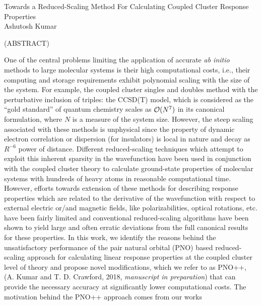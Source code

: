 \documentclass[12pt]{report}
\begin{document}
\thispagestyle{empty}
\begin{center}

{\Large
Towards a Reduced-Scaling Method For Calculating Coupled Cluster Response Properties 
}\\

\vspace{8em}
Ashutosh Kumar
\vspace{8em}


(ABSTRACT)


\end{center}
One of the central problems limiting the application of accurate {\em ab
initio} methods to large molecular systems is their high computational costs,
i.e., their computing and storage requirements exhibit polynomial scaling with
the size of the system. For example, the coupled cluster singles and doubles 
method with the perturbative inclusion of triples: the CCSD(T) model, 
which is considered as the ``gold standard'' of quantum chemistry scales as 
${\cal O}(N^7)$ in its canonical formulation, where $N$ is a measure of the 
system size. However, the steep scaling associated with these methods is 
unphysical since the property of dynamic electron correlation or dispersion 
(for insulators) is local in nature and decay as $R^{-6}$ power of distance. 
Different reduced-scaling techniques which attempt to exploit this inherent 
sparsity in the wavefunction have been used in conjunction with the coupled cluster 
theory to calculate ground-state properties of molecular systems with
hundreds of heavy atoms in reasonable computational time. However, efforts towards
extension of these methods for describing response properties which are related to the 
derivative of the wavefunction with respect to external electric or/and magnetic fields, 
like polarizabilities, optical rotations, etc. have been fairly limited and conventional 
reduced-scaling algorithms have been shown to yield large and often erratic deviations from 
the full canonical results for these properties. In this work, we identify the reasons behind 
the unsatisfactory performance of the pair natural orbital (PNO) based reduced-scaling 
approach for calculating linear response properties at the coupled cluster level of theory 
and propose novel modifications, which we refer to as PNO++, (A. Kumar and T. D. Crawford, 
2018, {\em manuscript in preparation}) that can provide the necessary accuracy at significantly 
lower computational costs. The motivation behind the PNO++ approach comes from our works 
\end{document}
